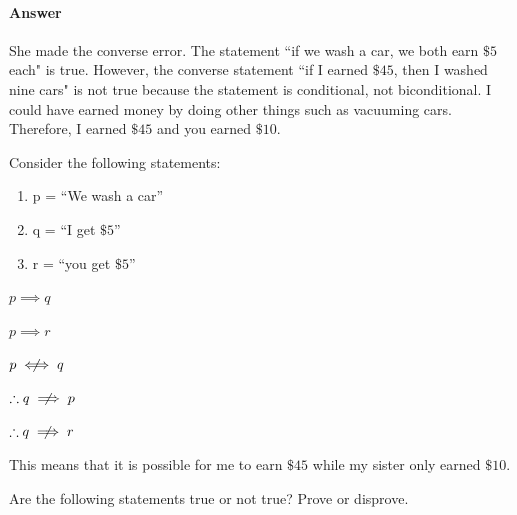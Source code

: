 \documentclass{article}
\begin{document}
\paragraph{Answer}

She made the converse error. The statement ``if we wash a car, we both earn $\$5$ each" is true.
However, the converse statement ``if I earned $\$45$, then I washed nine cars" is not true because the statement is conditional, not biconditional. I could have earned money by doing other things such as vacuuming cars.
Therefore, I earned $\$45$ and you earned $\$10$.

Consider the following statements:
\begin{enumerate}
    \item p = ``We wash a car''
    \item q = ``I get $\$5$''
    \item r = ``you get $\$5$''
\end{enumerate}
$p \implies q$

$p \implies r$

$p \centernot \iff q$

$\therefore q \centernot \implies p$

$\therefore q \centernot \implies r$

This means that it is possible for me to earn $\$45$ while my sister only earned $\$10$.



Are the following statements true or not true?    Prove or disprove.
\end{document}
